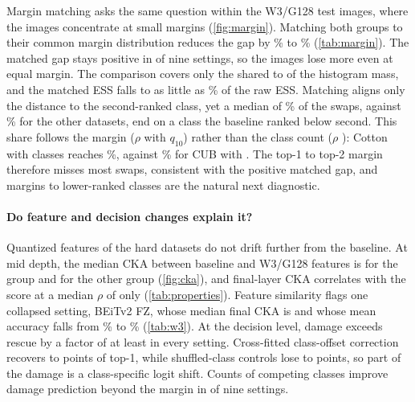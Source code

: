Margin matching asks the same question within the W3/G128 test images, where the \SC{} images concentrate at small margins (\cref{fig:margin}).
Matching both groups to their common margin distribution reduces the gap by \% to \% (\cref{tab:margin}).
The matched gap stays positive in  of nine settings, so the \SC{} images lose more even at equal margin.
The comparison covers only the shared  to  of the histogram mass, and the matched ESS falls to as little as \% of the raw ESS.
Matching aligns only the distance to the second-ranked class, yet a median of \% of the \SC{} swaps, against \% for the other datasets, end on a class the baseline ranked below second.
This share follows the margin ($\rho$  with $q_{10}$) rather than the class count ($\rho$ ): Cotton with  classes reaches \%, against \% for CUB with .
The top-1 to top-2 margin therefore misses most \SC{} swaps, consistent with the positive matched gap, and margins to lower-ranked classes are the natural next diagnostic.

\paragraph{Do feature and decision changes explain it?}
Quantized features of the hard datasets do not drift further from the baseline.
At mid depth, the median CKA between baseline and W3/G128 features is  for the \SC{} group and  for the other group (\cref{fig:cka}), and final-layer CKA correlates with the score at a median $\rho$ of only  (\cref{tab:properties}).
Feature similarity flags one collapsed setting, BEiTv2 FZ, whose median final CKA is  and whose mean accuracy falls from \% to \% (\cref{tab:w3}).
At the decision level, damage exceeds rescue by a factor of at least  in every setting.
Cross-fitted class-offset correction recovers  to  points of top-1, while shuffled-class controls lose  to  points, so part of the damage is a class-specific logit shift.
Counts of competing classes improve damage prediction beyond the margin in  of nine settings.
